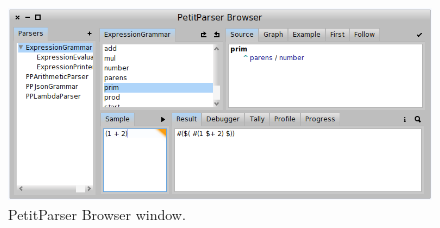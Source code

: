 \documentclass[a4paper,10pt,twoside]{book}
\begin{document}
\begin{figure}
  \begin{center}
    \includegraphics[width=\linewidth]{PPBrowser}
    \caption{PetitParser Browser window. \label{fig:pp/browser}}
  \end{center}
\end{figure}
\end{document}
